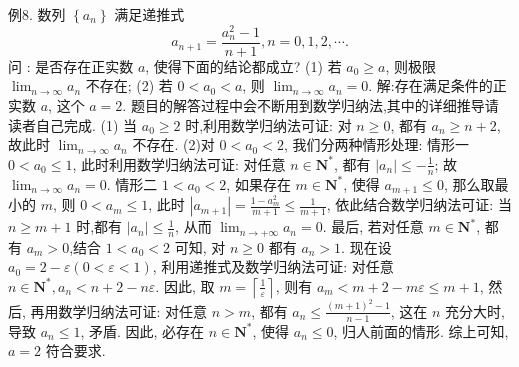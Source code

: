 例8. 数列 $\left\{a_n\right\}$ 满足递推式
$$
a_{n+1}=\frac{a_n^2-1}{n+1}, n=0,1,2, \cdots .
$$
问 : 是否存在正实数 $a$, 使得下面的结论都成立?
(1) 若 $a_0 \geqslant a$, 则极限 $\lim _{n \rightarrow \infty} a_n$ 不存在;
(2) 若 $0<a_0<a$, 则 $\lim _{n \rightarrow \infty} a_n=0$.
解:存在满足条件的正实数 $a$, 这个 $a=2$. 题目的解答过程中会不断用到数学归纳法,其中的详细推导请读者自己完成.
(1) 当 $a_0 \geqslant 2$ 时,利用数学归纳法可证: 对 $n \geqslant 0$, 都有 $a_n \geqslant n+2$, 故此时 $\lim _{n \rightarrow \infty} a_n$ 不存在.
(2)对 $0<a_0<2$, 我们分两种情形处理:
情形一 $0<a_0 \leqslant 1$, 此时利用数学归纳法可证: 对任意 $n \in \mathbf{N}^*$, 都有 $\left|a_n\right| \leqslant-\frac{1}{n}$; 故 $\lim _{n \rightarrow \infty} a_n=0$.
情形二 $1<a_0<2$, 如果存在 $m \in \mathbf{N}^*$, 使得 $a_{m+1} \leqslant 0$, 那么取最小的 $m$, 则 $0<a_m \leqslant 1$, 此时 $\left|a_{m+1}\right|=\frac{1-a_m^2}{m+1} \leqslant \frac{1}{m+1}$, 依此结合数学归纳法可证: 当 $n \geqslant m+1$ 时,都有 $\left|a_n\right| \leqslant \frac{1}{n}$, 从而 $\lim _{n \rightarrow+\infty} a_n=0$.
最后, 若对任意 $m \in \mathbf{N}^*$, 都有 $a_m>0$,结合 $1<a_0<2$ 可知, 对 $n \geqslant 0$ 都有 $a_n>1$. 现在设 $a_0=2-\varepsilon(0<\varepsilon<1)$, 利用递推式及数学归纳法可证: 对任意 $n \in \mathbf{N}^*, a_n<n+2-n \varepsilon$. 因此, 取 $m=\left\lceil\frac{1}{\varepsilon}\right\rceil$, 则有 $a_m<m+2-m \varepsilon \leqslant m+1$, 然后, 再用数学归纳法可证: 对任意 $n>m$, 都有 $a_n \leqslant \frac{(m+1)^2-1}{n-1}$, 这在 $n$ 充分大时, 导致 $a_n \leqslant 1$, 矛盾.
因此, 必存在 $n \in \mathbf{N}^*$, 使得 $a_n \leqslant 0$, 归人前面的情形.
综上可知, $a=2$ 符合要求.


